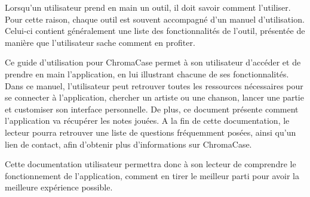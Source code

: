 Lorsqu’un utilisateur prend en main un outil, il doit savoir comment l’utiliser. Pour cette raison, chaque outil est souvent accompagné d’un manuel d’utilisation. Celui-ci contient généralement une liste des fonctionnalités de l’outil, présentée de manière que l’utilisateur sache comment en profiter.

Ce guide d’utilisation pour ChromaCase permet à son utilisateur d’accéder et de prendre en main l’application, en lui illustrant chacune de ses fonctionnalités.
Dans ce manuel, l’utilisateur peut retrouver toutes les ressources nécessaires pour se connecter à l’application, chercher un artiste ou une chanson, lancer une partie et customiser son interface personnelle. De plus, ce document présente comment l’application va récupérer les notes jouées. A la fin de cette documentation, le lecteur pourra retrouver une liste de questions fréquemment posées, ainsi qu’un lien de contact, afin d’obtenir plus d'informations sur ChromaCase.

Cette documentation utilisateur permettra donc à son lecteur de comprendre le fonctionnement de l’application, comment en tirer le meilleur parti pour avoir la meilleure expérience possible.
